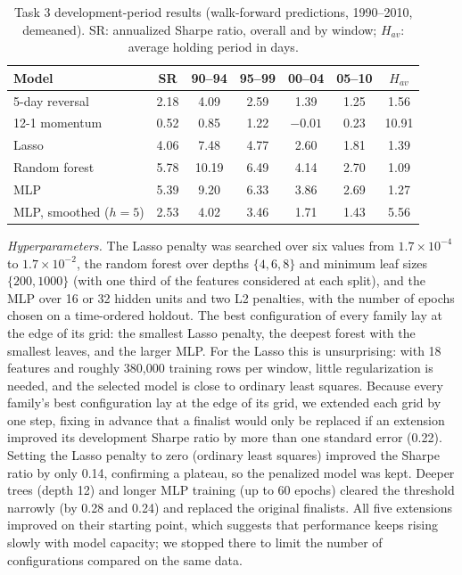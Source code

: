 \begin{table}[t]
\caption{Task 3 development-period results (walk-forward predictions, 1990--2010, demeaned). SR: annualized Sharpe ratio, overall and by window; $H_{av}$: average holding period in days.}
\label{tab:t3_dev}
\centering
\small
\setlength{\tabcolsep}{3.5pt}
\begin{tabular}{lcccccc}
\hline
Model & SR & 90--94 & 95--99 & 00--04 & 05--10 & $H_{av}$ \\
\hline
5-day reversal       & 2.18 & 4.09 & 2.59 & 1.39 & 1.25 & 1.56 \\
12-1 momentum        & 0.52 & 0.85 & 1.22 & $-0.01$ & 0.23 & 10.91 \\
Lasso                & 4.06 & 7.48 & 4.77 & 2.60 & 1.81 & 1.39 \\
Random forest        & 5.78 & 10.19 & 6.49 & 4.14 & 2.70 & 1.09 \\
MLP                  & 5.39 & 9.20 & 6.33 & 3.86 & 2.69 & 1.27 \\
MLP, smoothed ($h=5$) & 2.53 & 4.02 & 3.46 & 1.71 & 1.43 & 5.56 \\
\hline
\end{tabular}
\end{table}

\textit{Hyperparameters.} The Lasso penalty was searched over six values from $1.7\times10^{-4}$ to $1.7\times10^{-2}$, the random forest over depths $\{4,6,8\}$ and minimum leaf sizes $\{200, 1000\}$ (with one third of the features considered at each split), and the MLP over 16 or 32 hidden units and two L2 penalties, with the number of epochs chosen on a time-ordered holdout. The best configuration of every family lay at the edge of its grid: the smallest Lasso penalty, the deepest forest with the smallest leaves, and the larger MLP. For the Lasso this is unsurprising: with 18 features and roughly 380{,}000 training rows per window, little regularization is needed, and the selected model is close to ordinary least squares. Because every family's best configuration lay at the edge of its grid, we extended each grid by one step, fixing in advance that a finalist would only be replaced if an extension improved its development Sharpe ratio by more than one standard error (0.22). Setting the Lasso penalty to zero (ordinary least squares) improved the Sharpe ratio by only 0.14, confirming a plateau, so the penalized model was kept. Deeper trees (depth 12) and longer MLP training (up to 60 epochs) cleared the threshold narrowly (by 0.28 and 0.24) and replaced the original finalists. All five extensions improved on their starting point, which suggests that performance keeps rising slowly with model capacity; we stopped there to limit the number of configurations compared on the same data.

